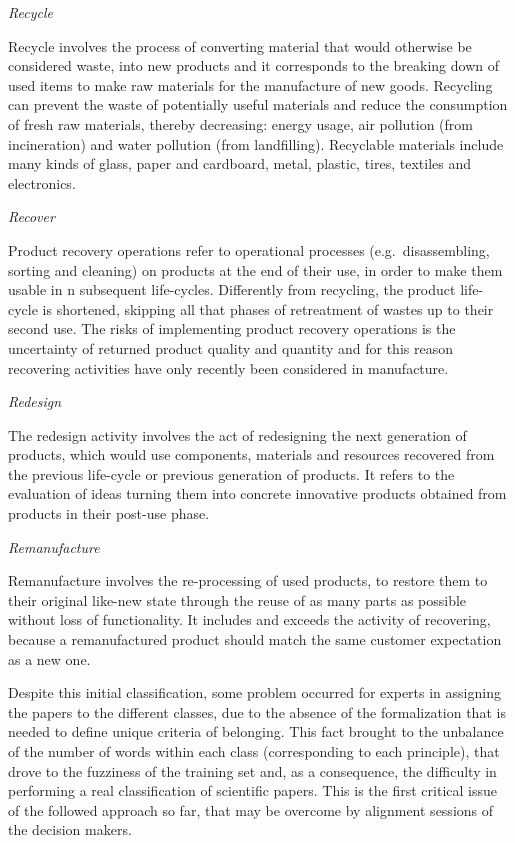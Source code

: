 \documentclass[]{book}
\begin{document}
\emph{Recycle}

Recycle involves the process of converting material that would otherwise
be considered waste, into new products and it corresponds to the
breaking down of used items to make raw materials for the manufacture of
new goods. Recycling can prevent the waste of potentially useful
materials and reduce the consumption of fresh raw materials, thereby
decreasing: energy usage, air pollution (from incineration) and water
pollution (from landfilling). Recyclable materials include many kinds of
glass, paper and cardboard, metal, plastic, tires, textiles and
electronics.

\emph{Recover}

Product recovery operations refer to operational processes
(e.g.~disassembling, sorting and cleaning) on products at the end of
their use, in order to make them usable in n subsequent life-cycles.
Differently from recycling, the product life-cycle is shortened,
skipping all that phases of retreatment of wastes up to their second
use. The risks of implementing product recovery operations is the
uncertainty of returned product quality and quantity and for this reason
recovering activities have only recently been considered in manufacture.

\emph{Redesign}

The redesign activity involves the act of redesigning the next
generation of products, which would use components, materials and
resources recovered from the previous life-cycle or previous generation
of products. It refers to the evaluation of ideas turning them into
concrete innovative products obtained from products in their post-use
phase.

\emph{Remanufacture}

Remanufacture involves the re-processing of used products, to restore
them to their original like-new state through the reuse of as many parts
as possible without loss of functionality. It includes and exceeds the
activity of recovering, because a remanufactured product should match
the same customer expectation as a new one.

Despite this initial classification, some problem occurred for experts
in assigning the papers to the different classes, due to the absence of
the formalization that is needed to define unique criteria of belonging.
This fact brought to the unbalance of the number of words within each
class (corresponding to each principle), that drove to the fuzziness of
the training set and, as a consequence, the difficulty in performing a
real classification of scientific papers. This is the first critical
issue of the followed approach so far, that may be overcome by alignment
sessions of the decision makers.
\end{document}
